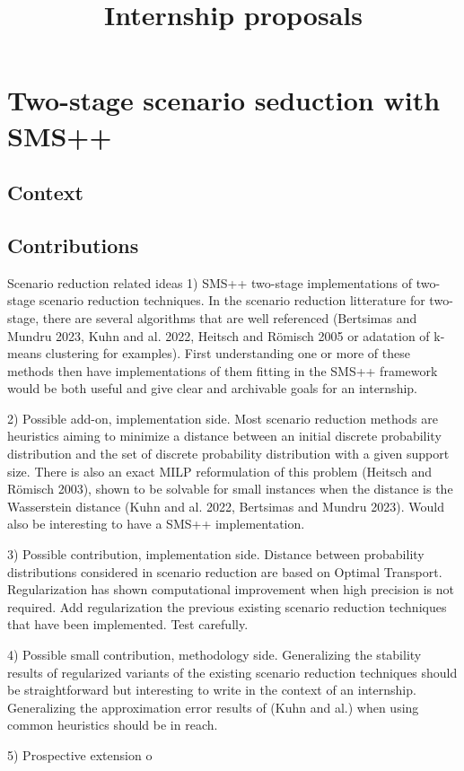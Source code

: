 \documentclass{amsart}
\title{Internship proposals}
\begin{document}
\maketitle

\section{Two-stage scenario seduction with SMS++}

\subsection{Context}

\subsection{Contributions}


Scenario reduction related ideas
1) SMS++ two-stage implementations of two-stage scenario reduction techniques. In the scenario reduction litterature for two-stage, there are several algorithms that are well referenced (Bertsimas and Mundru 2023, Kuhn and al. 2022, Heitsch and Römisch 2005 or adatation of k-means clustering for examples). First understanding one or more of these methods then have implementations of them fitting in the SMS++ framework would be both useful and give clear and archivable goals for an internship. 

2) Possible add-on, implementation side.  Most scenario reduction methods are heuristics aiming to minimize a distance between an initial discrete probability distribution and the set of discrete probability distribution with a given support size. There is also an exact MILP reformulation of this problem (Heitsch and Römisch 2003), shown to be solvable for small instances when the distance is the Wasserstein distance (Kuhn and al. 2022, Bertsimas and Mundru 2023). Would also be interesting to have a SMS++ implementation.

3) Possible contribution, implementation side. Distance between probability distributions considered in scenario reduction are based on Optimal Transport. Regularization has shown computational improvement when high precision is not required. Add regularization the previous existing scenario reduction techniques that have been implemented. Test carefully.

4) Possible small contribution, methodology side. Generalizing the stability results of regularized variants of the existing scenario reduction techniques should be straightforward but interesting to write in the context of an internship. Generalizing the approximation error results of (Kuhn and al.) when using common heuristics should be in reach.

5) Prospective extension o
\end{document}
